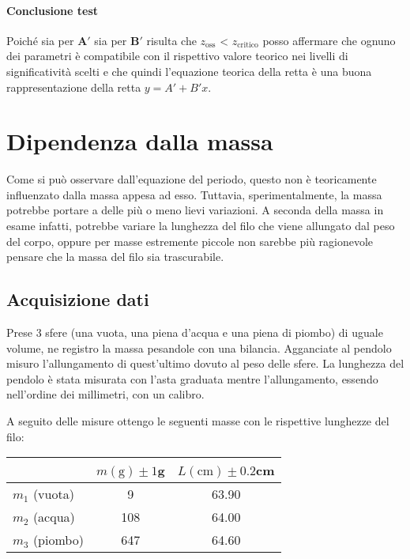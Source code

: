 \documentclass{article}
\begin{document}
	\paragraph{Conclusione test} Poiché sia per $\mathbf{A'}$ sia per $\mathbf{B'}$ risulta che $z_{\text{oss}}$ < $z_{\text{critico}}$ posso affermare che ognuno dei parametri  è compatibile con il rispettivo valore teorico nei livelli di significatività scelti e che quindi l'equazione teorica della retta è una buona rappresentazione della retta $y=A' + B'x$.\\
	
	
	
	
	
	
	
	\section{Dipendenza dalla massa}
	Come si può osservare dall'equazione del periodo, questo non è teoricamente influenzato dalla massa appesa ad esso. Tuttavia, sperimentalmente, la massa potrebbe portare a delle più o meno lievi variazioni. A seconda della massa in esame infatti, potrebbe variare la lunghezza del filo che viene allungato dal peso del corpo, oppure per masse estremente piccole non sarebbe più ragionevole pensare che la massa del filo sia trascurabile.
	
	
	
	\subsection{Acquisizione dati}
	Prese 3 sfere (una vuota, una piena d'acqua e una piena di piombo) di uguale volume, ne registro la massa pesandole con una bilancia. Agganciate al pendolo misuro l'allungamento di quest'ultimo dovuto al peso delle sfere. La lunghezza del pendolo è stata misurata con l'asta graduata mentre l'allungamento, essendo nell'ordine dei millimetri, con un calibro. 
	
	A seguito delle misure ottengo le seguenti masse con le rispettive lunghezze del filo:
	
	\vspace{0.5cm}
	\begin{table}[H]
		\centering
		\begin{tabular}{@{}lcc@{}}
				& \multicolumn{1}{l}{$m(\text{g}) \pm 1$g} & \multicolumn{1}{l}{$L(\text{cm}) \pm 0.2$cm}  \\ \midrule
			$m_1$ (vuota)   & 9& 63.90                                            \\
			$m_2$ (acqua)  & 108 & 64.00                                          \\
			$m_3$ (piombo)  & 647  & 64.60                                        \\ \bottomrule
		\end{tabular}
	\end{table}
	\vspace{0.5cm}
	
\end{document}
